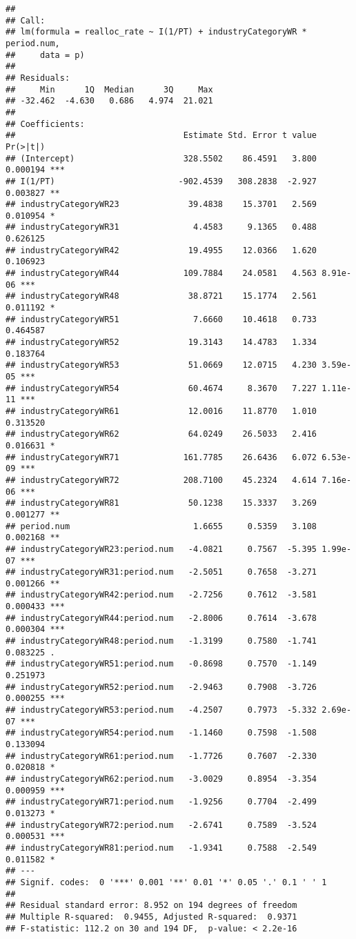 \documentclass[
]{article}
\begin{document}
\begin{verbatim}
## 
## Call:
## lm(formula = realloc_rate ~ I(1/PT) + industryCategoryWR * period.num, 
##     data = p)
## 
## Residuals:
##     Min      1Q  Median      3Q     Max 
## -32.462  -4.630   0.686   4.974  21.021 
## 
## Coefficients:
##                                  Estimate Std. Error t value Pr(>|t|)    
## (Intercept)                      328.5502    86.4591   3.800 0.000194 ***
## I(1/PT)                         -902.4539   308.2838  -2.927 0.003827 ** 
## industryCategoryWR23              39.4838    15.3701   2.569 0.010954 *  
## industryCategoryWR31               4.4583     9.1365   0.488 0.626125    
## industryCategoryWR42              19.4955    12.0366   1.620 0.106923    
## industryCategoryWR44             109.7884    24.0581   4.563 8.91e-06 ***
## industryCategoryWR48              38.8721    15.1774   2.561 0.011192 *  
## industryCategoryWR51               7.6660    10.4618   0.733 0.464587    
## industryCategoryWR52              19.3143    14.4783   1.334 0.183764    
## industryCategoryWR53              51.0669    12.0715   4.230 3.59e-05 ***
## industryCategoryWR54              60.4674     8.3670   7.227 1.11e-11 ***
## industryCategoryWR61              12.0016    11.8770   1.010 0.313520    
## industryCategoryWR62              64.0249    26.5033   2.416 0.016631 *  
## industryCategoryWR71             161.7785    26.6436   6.072 6.53e-09 ***
## industryCategoryWR72             208.7100    45.2324   4.614 7.16e-06 ***
## industryCategoryWR81              50.1238    15.3337   3.269 0.001277 ** 
## period.num                         1.6655     0.5359   3.108 0.002168 ** 
## industryCategoryWR23:period.num   -4.0821     0.7567  -5.395 1.99e-07 ***
## industryCategoryWR31:period.num   -2.5051     0.7658  -3.271 0.001266 ** 
## industryCategoryWR42:period.num   -2.7256     0.7612  -3.581 0.000433 ***
## industryCategoryWR44:period.num   -2.8006     0.7614  -3.678 0.000304 ***
## industryCategoryWR48:period.num   -1.3199     0.7580  -1.741 0.083225 .  
## industryCategoryWR51:period.num   -0.8698     0.7570  -1.149 0.251973    
## industryCategoryWR52:period.num   -2.9463     0.7908  -3.726 0.000255 ***
## industryCategoryWR53:period.num   -4.2507     0.7973  -5.332 2.69e-07 ***
## industryCategoryWR54:period.num   -1.1460     0.7598  -1.508 0.133094    
## industryCategoryWR61:period.num   -1.7726     0.7607  -2.330 0.020818 *  
## industryCategoryWR62:period.num   -3.0029     0.8954  -3.354 0.000959 ***
## industryCategoryWR71:period.num   -1.9256     0.7704  -2.499 0.013273 *  
## industryCategoryWR72:period.num   -2.6741     0.7589  -3.524 0.000531 ***
## industryCategoryWR81:period.num   -1.9341     0.7588  -2.549 0.011582 *  
## ---
## Signif. codes:  0 '***' 0.001 '**' 0.01 '*' 0.05 '.' 0.1 ' ' 1
## 
## Residual standard error: 8.952 on 194 degrees of freedom
## Multiple R-squared:  0.9455, Adjusted R-squared:  0.9371 
## F-statistic: 112.2 on 30 and 194 DF,  p-value: < 2.2e-16
\end{verbatim}
\end{document}

